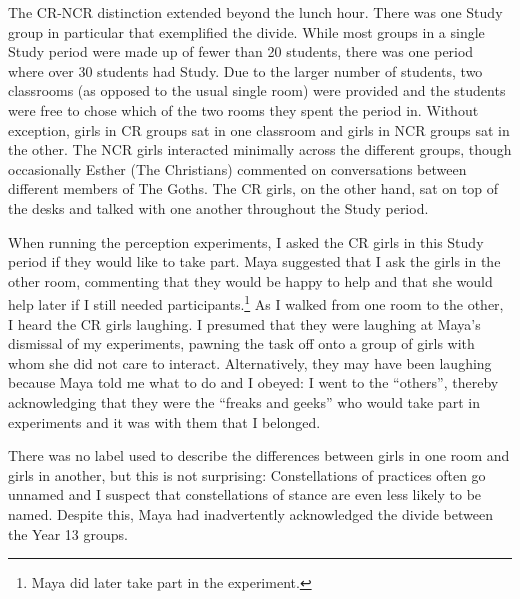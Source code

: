 The CR-NCR distinction extended beyond the lunch hour. There was one Study group in particular that exemplified the divide. While most groups in a single Study period were made up of fewer than 20 students, there was one period where over 30 students had Study. Due to the larger number of students, two classrooms (as opposed to the usual single room) were provided and the students were free to chose which of the two rooms they spent the period in. Without exception, girls in CR groups sat in one classroom and girls in NCR groups sat in the other. The NCR girls interacted minimally across the different groups, though occasionally Esther (The Christians) commented on conversations between different members of The Goths. The CR girls, on the other hand, sat on top of the desks and talked with one another throughout the Study period.

When running the perception experiments, I asked the CR girls in this Study period if they would like to take part. Maya suggested that I ask the girls in the other room, commenting that they would be happy to help and that she would help later if I still needed participants.\footnote{Maya did later take part in the experiment.}  As I walked from one room to the other, I heard the CR girls laughing. I presumed that they were laughing at Maya's dismissal of my experiments, pawning the task off onto a group of girls with whom she did not care to interact. Alternatively, they may have been laughing because Maya told me what to do and I obeyed: I went to the ``others'', thereby acknowledging that they were the ``freaks and geeks'' who would take part in experiments and it was with them that I belonged. 

There was no label used to describe the differences between girls in one room and girls in another, but this is not surprising: Constellations of practices often go unnamed \citep[128]{wenger1998} and I suspect that constellations of stance are even less likely to be named. Despite this, Maya had inadvertently acknowledged the divide between the Year 13 groups.



